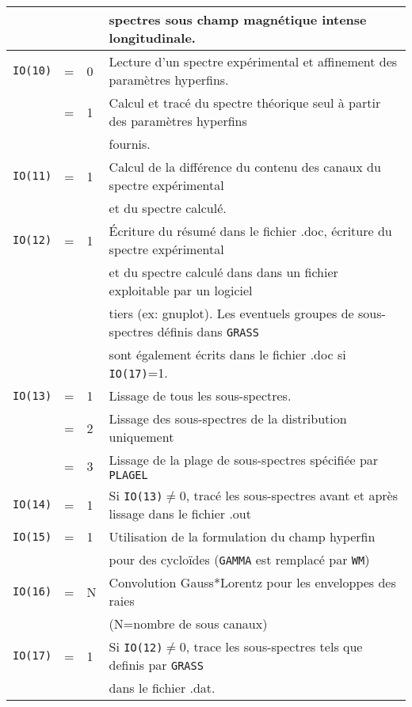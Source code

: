 \begin{table}
\begin{tabular}{|rcl|l|}
                  & &   &spectres sous champ magnétique intense longitudinale.\\
\hline  
\lstinline{IO(10)}&=& 0 & Lecture d'un spectre expérimental et affinement des paramètres hyperfins. \\
                  &=& 1 & Calcul et tracé du spectre théorique seul à partir des paramètres hyperfins\\
                  & &   & fournis. \\
\hline  
\lstinline{IO(11)}&=& 1 & Calcul de la différence du contenu des canaux du spectre expérimental\\
                  & &  & et du spectre calculé.\\
\hline  
\lstinline{IO(12)}&=& 1 & \'Ecriture du résumé dans le fichier .doc, écriture du spectre expérimental\\
                  & &   & et du spectre calculé dans dans un fichier exploitable par un logiciel\\
                  & &   &  tiers (ex: gnuplot). Les eventuels groupes de sous-spectres définis dans \lstinline{GRASS}\\
                  & &   &  sont également écrits dans le fichier .doc si \lstinline{IO(17)}=1.\\
\hline  
\lstinline{IO(13)}&=& 1 & Lissage de tous les sous-spectres. \\
                  &=& 2 & Lissage des sous-spectres de la distribution uniquement \\
                  &=& 3 & Lissage de la plage de sous-spectres spécifiée par \lstinline{PLAGEL} \\
\hline  
\lstinline{IO(14)}&=& 1 & Si \lstinline{IO(13)}$\neq$0, tracé les sous-spectres avant et après lissage dans le fichier .out \\
\hline  
\lstinline{IO(15)}&=& 1 & Utilisation de la formulation du champ hyperfin \\
                  & &   & pour des cycloïdes (\lstinline{GAMMA} est remplacé par \lstinline{WM})\\
\hline
\lstinline{IO(16)}&=& N & Convolution Gauss*Lorentz pour les enveloppes des raies\\
                  & &  & (N=nombre de sous canaux)\\
\hline  
\lstinline{IO(17)}&=& 1 & Si \lstinline{IO(12)}$\neq$0, trace les sous-spectres tels que definis par \lstinline{GRASS}\\
                  & &   & dans le fichier .dat. \\

\end{tabular}
\end{table}
